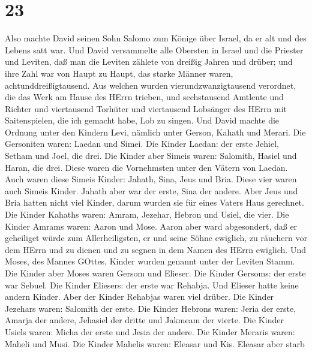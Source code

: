 \hypertarget{section-22}{%
\section{23}\label{section-22}}

 Also machte David seinen Sohn Salomo zum Könige über
Israel, da er alt und des Lebens satt war.  Und David
versammelte alle Obersten in Israel und die Priester und Leviten,
 daß man die Leviten zählete von dreißig Jahren und drüber;
und ihre Zahl war von Haupt zu Haupt, das starke Männer waren,
achtunddreißigtausend.  Aus welchen wurden
vierundzwanzigtausend verordnet, die das Werk am Hause des HErrn
trieben, und sechstausend Amtleute und Richter  und
viertausend Torhüter und viertausend Lobsänger des HErrn mit
Saitenspielen, die ich gemacht habe, Lob zu singen.  Und
David machte die Ordnung unter den Kindern Levi, nämlich unter Gerson,
Kahath und Merari.  Die Gersoniten waren: Laedan und Simei.
 Die Kinder Laedan: der erste Jehiel, Setham und Joel, die
drei.  Die Kinder aber Simeis waren: Salomith, Hasiel und
Haran, die drei. Diese waren die Vornehmsten unter den Vätern von
Laedan.  Auch waren diese Simeis Kinder: Jahath, Sina, Jeus
und Bria. Diese vier waren auch Simeis Kinder.  Jahath aber
war der erste, Sina der andere. Aber Jeus und Bria hatten nicht viel
Kinder, darum wurden sie für eines Vaters Haus gerechnet. 
Die Kinder Kahaths waren: Amram, Jezehar, Hebron und Usiel, die vier.
 Die Kinder Amrams waren: Aaron und Mose. Aaron aber ward
abgesondert, daß er geheiliget würde zum Allerheiligsten, er und seine
Söhne ewiglich, zu räuchern vor dem HErrn und zu dienen und zu segnen in
dem Namen des HErrn ewiglich.  Und Moses, des Mannes
GOttes, Kinder wurden genannt unter der Leviten Stamm.  Die
Kinder aber Moses waren Gersom und Elieser.  Die Kinder
Gersoms: der erste war Sebuel.  Die Kinder Eliesers: der
erste war Rehabja. Und Elieser hatte keine andern Kinder. Aber der
Kinder Rehabjas waren viel drüber.  Die Kinder Jezehars
waren: Salomith der erste.  Die Kinder Hebrons waren: Jeria
der erste, Amarja der andere, Jehasiel der dritte und Jakmeam der
vierte.  Die Kinder Usiels waren: Micha der erste und Jesia
der andere.  Die Kinder Meraris waren: Maheli und Musi. Die
Kinder Mahelis waren: Eleasar und Kis.  Eleasar aber starb
